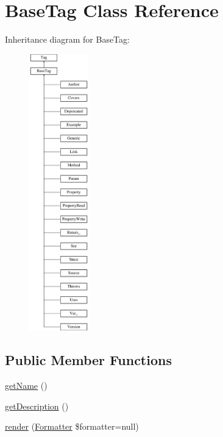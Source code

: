 \hypertarget{classphp_documentor_1_1_reflection_1_1_doc_block_1_1_tags_1_1_base_tag}{}\section{Base\+Tag Class Reference}
\label{classphp_documentor_1_1_reflection_1_1_doc_block_1_1_tags_1_1_base_tag}
Inheritance diagram for Base\+Tag\+:\begin{figure}[H]
\begin{center}
\leavevmode
\includegraphics[height=12.000000cm]{classphp_documentor_1_1_reflection_1_1_doc_block_1_1_tags_1_1_base_tag}
\end{center}
\end{figure}
\subsection*{Public Member Functions}
\begin{DoxyCompactItemize}
\item 
\mbox{\hyperlink{classphp_documentor_1_1_reflection_1_1_doc_block_1_1_tags_1_1_base_tag_a3d0963e68bb313b163a73f2803c64600}{get\+Name}} ()
\item 
\mbox{\hyperlink{classphp_documentor_1_1_reflection_1_1_doc_block_1_1_tags_1_1_base_tag_a2e7bb35c71bf1824456ceb944cb7a845}{get\+Description}} ()
\item 
\mbox{\hyperlink{classphp_documentor_1_1_reflection_1_1_doc_block_1_1_tags_1_1_base_tag_ac20fbfe3216d76776b5e743bd16427f9}{render}} (\mbox{\hyperlink{interfacephp_documentor_1_1_reflection_1_1_doc_block_1_1_tags_1_1_formatter}{Formatter}} \$formatter=null)
\end{DoxyCompactItemize}
